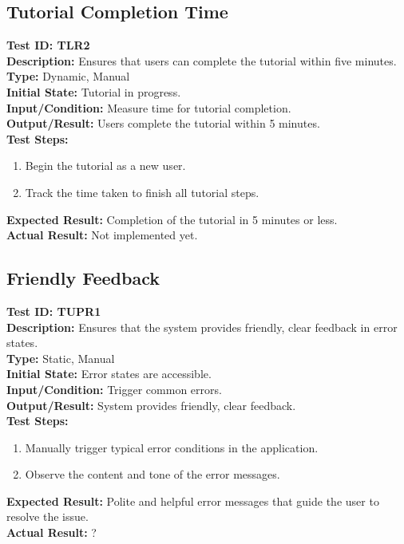 \documentclass[12pt, titlepage]{article}
\begin{document}
\subsection{Tutorial Completion Time}
\textbf{Test ID: TLR2}\\
\textbf{Description:} Ensures that users can complete the tutorial within five minutes.\\
\textbf{Type:} Dynamic, Manual\\
\textbf{Initial State:} Tutorial in progress.\\
\textbf{Input/Condition:} Measure time for tutorial completion.\\
\textbf{Output/Result:} Users complete the tutorial within 5 minutes.\\
\textbf{Test Steps:}
\begin{enumerate}
    \item Begin the tutorial as a new user.
    \item Track the time taken to finish all tutorial steps.
\end{enumerate}
\textbf{Expected Result:} Completion of the tutorial in 5 minutes or less.\\
\textbf{Actual Result:} Not implemented yet.

\subsection{Friendly Feedback}
\textbf{Test ID: TUPR1}\\
\textbf{Description:} Ensures that the system provides friendly, clear feedback in error states.\\
\textbf{Type:} Static, Manual\\
\textbf{Initial State:} Error states are accessible.\\
\textbf{Input/Condition:} Trigger common errors.\\
\textbf{Output/Result:} System provides friendly, clear feedback.\\
\textbf{Test Steps:}
\begin{enumerate}
    \item Manually trigger typical error conditions in the application.
    \item Observe the content and tone of the error messages.
\end{enumerate}
\textbf{Expected Result:} Polite and helpful error messages that guide the user to resolve the issue.\\
\textbf{Actual Result:} ?
\end{document}
